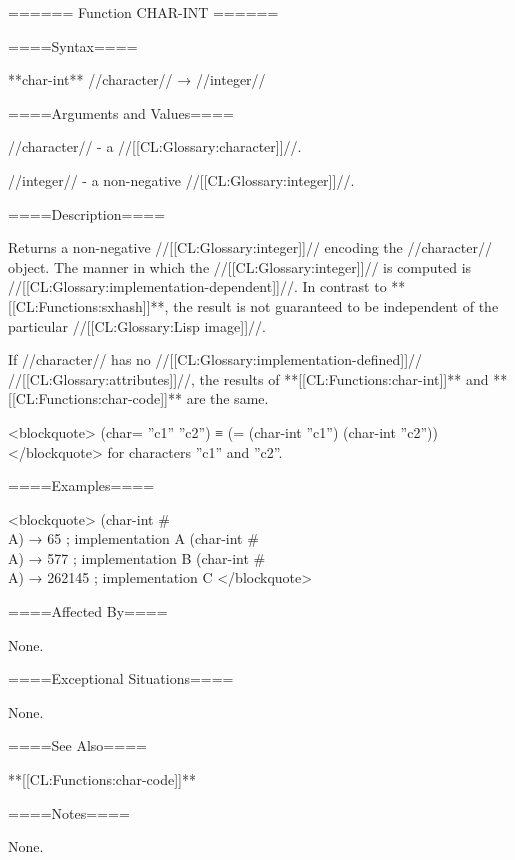 ====== Function CHAR-INT ======

====Syntax====

**char-int** //character// → //integer//

====Arguments and Values====

//character// - a //[[CL:Glossary:character]]//.

//integer// - a non-negative //[[CL:Glossary:integer]]//.

====Description====

Returns a non-negative //[[CL:Glossary:integer]]// encoding the //character// object. The manner in which the //[[CL:Glossary:integer]]// is computed is //[[CL:Glossary:implementation-dependent]]//. In contrast to **[[CL:Functions:sxhash]]**, the result is not guaranteed to be independent of the particular //[[CL:Glossary:Lisp image]]//.

If //character// has no //[[CL:Glossary:implementation-defined]]// //[[CL:Glossary:attributes]]//, the results of **[[CL:Functions:char-int]]** and **[[CL:Functions:char-code]]** are the same.

<blockquote> (char= ''c1'' ''c2'') ≡ (= (char-int ''c1'') (char-int ''c2'')) </blockquote> for characters ''c1'' and ''c2''.

====Examples====

<blockquote> (char-int #\\A) → 65 ; implementation A (char-int #\\A) → 577 ; implementation B (char-int #\\A) → 262145 ; implementation C </blockquote>

====Affected By====

None.

====Exceptional Situations====

None.

====See Also====

**[[CL:Functions:char-code]]**

====Notes====

None.


